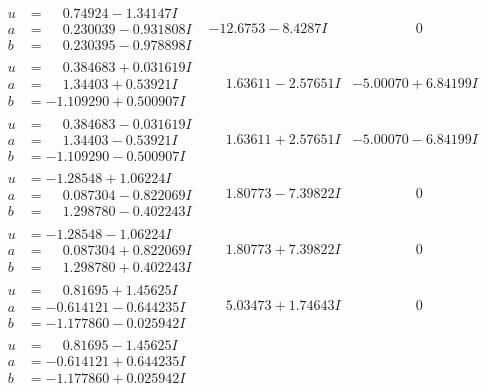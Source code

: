 \documentclass[1p]{elsarticle_modified}
\theoremstyle{definition}
\begin{document}
$$\begin{array}{c|c|c}
\begin{aligned}
u &= \phantom{-}0.74924 - 1.34147 I \\
a &= \phantom{-}0.230039 - 0.931808 I \\
b &= \phantom{-}0.230395 - 0.978898 I\end{aligned}
 & -12.6753 - 8.4287 I & \phantom{-0.000000 } 0 \\ \hline\begin{aligned}
u &= \phantom{-}0.384683 + 0.031619 I \\
a &= \phantom{-}1.34403 + 0.53921 I \\
b &= -1.109290 + 0.500907 I\end{aligned}
 & \phantom{-}1.63611 - 2.57651 I & -5.00070 + 6.84199 I \\ \hline\begin{aligned}
u &= \phantom{-}0.384683 - 0.031619 I \\
a &= \phantom{-}1.34403 - 0.53921 I \\
b &= -1.109290 - 0.500907 I\end{aligned}
 & \phantom{-}1.63611 + 2.57651 I & -5.00070 - 6.84199 I \\ \hline\begin{aligned}
u &= -1.28548 + 1.06224 I \\
a &= \phantom{-}0.087304 - 0.822069 I \\
b &= \phantom{-}1.298780 - 0.402243 I\end{aligned}
 & \phantom{-}1.80773 - 7.39822 I & \phantom{-0.000000 } 0 \\ \hline\begin{aligned}
u &= -1.28548 - 1.06224 I \\
a &= \phantom{-}0.087304 + 0.822069 I \\
b &= \phantom{-}1.298780 + 0.402243 I\end{aligned}
 & \phantom{-}1.80773 + 7.39822 I & \phantom{-0.000000 } 0 \\ \hline\begin{aligned}
u &= \phantom{-}0.81695 + 1.45625 I \\
a &= -0.614121 - 0.644235 I \\
b &= -1.177860 - 0.025942 I\end{aligned}
 & \phantom{-}5.03473 + 1.74643 I & \phantom{-0.000000 } 0 \\ \hline\begin{aligned}
u &= \phantom{-}0.81695 - 1.45625 I \\
a &= -0.614121 + 0.644235 I \\
b &= -1.177860 + 0.025942 I\end{aligned}

\end{array}$$
\end{document}

